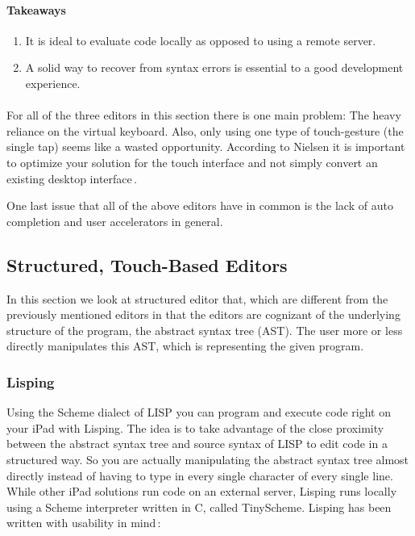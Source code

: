 \paragraph{Takeaways}
\begin{enumerate}
	\item It is ideal to evaluate code locally as opposed to using a remote server.
	\item A solid way to recover from syntax errors is essential to a good development experience.
\end{enumerate}

\paragraph{}

For all of the three editors in this section there is one main problem: The heavy reliance on the virtual keyboard. Also, only using one type of touch-gesture (the single tap) seems like a wasted opportunity.
According to Nielsen it is important to optimize your solution for the touch
interface and not simply convert an existing desktop interface\,\cite[p 26, p
41]{nielsen2013mobile}.

One last issue that all of the above editors have in common is the lack of auto completion and user accelerators in general.

\subsection{Structured, Touch-Based Editors}
In this section we look at structured editor that, which are different from the previously mentioned editors in that the editors are cognizant of the underlying structure of the program, the abstract syntax tree (AST). The user more or less directly manipulates this AST, which is representing the given program.

\subsubsection{Lisping}
\label{subsub:Lisping}
Using the Scheme dialect of LISP you can program and execute code right on your iPad with Lisping. The idea is to take advantage of the close proximity between the abstract syntax tree and source syntax of LISP to edit code in a structured way. So you are actually manipulating the abstract syntax tree almost directly instead of having to type in every single character of every single line. While other iPad solutions run code on an external server, Lisping runs locally using a Scheme interpreter written in C, called TinyScheme. Lisping has been written with usability in mind\,\cite{lisping}: 

